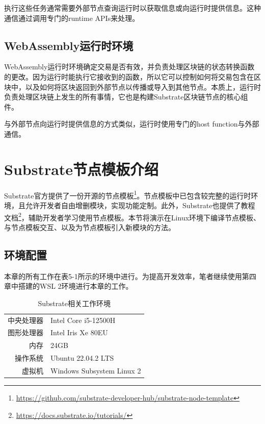 执行这些任务通常需要外部节点查询运行时以获取信息或向运行时提供信息。这种通信通过调用专门的runtime APIs来处理。

\subsection{WebAssembly运行时环境}

WebAssembly运行时环境确定交易是否有效，并负责处理区块链的状态转换函数的更改。因为运行时能执行它接收到的函数，所以它可以控制如何将交易包含在区块中，以及如何将区块返回到外部节点以传播或导入到其他节点。本质上，运行时负责处理区块链上发生的所有事情，它也是构建Substrate区块链节点的核心组件。

与外部节点向运行时提供信息的方式类似，运行时使用专门的host function与外部通信。

\section{Substrate节点模板介绍}

Substrate官方提供了一份开源的节点模板\footnote{\url{https://github.com/substrate-developer-hub/substrate-node-template}}。节点模板中已包含较完整的运行时环境，且允许开发者自由增删模块，实现功能定制。此外，Substrate也提供了教程文档\footnote{\url{https://docs.substrate.io/tutorials/}}，辅助开发者学习使用节点模板。本节将演示在Linux环境下编译节点模板、与节点模板交互、以及为节点模板引入新模块的方法。

\subsection{环境配置}

本章的所有工作在表5-1所示的环境中进行。为提高开发效率，笔者继续使用第四章中搭建的WSL 2环境进行本章的工作。

\begin{table}[htbp]
    \linespread{1.5}
    \centering
    \caption{Substrate相关工作环境}\label{Substrate相关工作环境}
    \begin{tabular}{r|l} \toprule
        中央处理器 & Intel Core i5-12500H      \\
        图形处理器 & Intel Iris Xe 80EU        \\
        内存    & 24GB                      \\
        操作系统  & Ubuntu 22.04.2 LTS        \\
        虚拟机   & Windows Subsystem Linux 2 \\
        \bottomrule
    \end{tabular}
\end{table}

